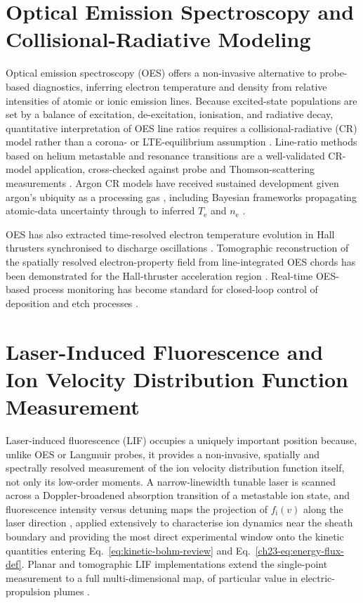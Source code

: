 \section{Optical Emission Spectroscopy and Collisional-Radiative Modeling}

Optical emission spectroscopy (OES) offers a non-invasive alternative to probe-based diagnostics, inferring electron temperature and density from relative intensities of atomic or ionic emission lines. Because excited-state populations are set by a balance of excitation, de-excitation, ionisation, and radiative decay, quantitative interpretation of OES line ratios requires a collisional-radiative (CR) model rather than a corona- or LTE-equilibrium assumption \cite{ref0260}. Line-ratio methods based on helium metastable and resonance transitions are a well-validated CR-model application, cross-checked against probe and Thomson-scattering measurements \cite{ref0266}. Argon CR models have received sustained development given argon's ubiquity as a processing gas \cite{ref0245}, including Bayesian frameworks propagating atomic-data uncertainty through to inferred $T_{\mathrm{e}}$ and $n_{\mathrm{e}}$ \cite{ref0275}.

OES has also extracted time-resolved electron temperature evolution in Hall thrusters synchronised to discharge oscillations \cite{ref0256}. Tomographic reconstruction of the spatially resolved electron-property field from line-integrated OES chords has been demonstrated for the Hall-thruster acceleration region \cite{ref0257}. Real-time OES-based process monitoring has become standard for closed-loop control of deposition and etch processes \cite{ref0553}.

\section{Laser-Induced Fluorescence and Ion Velocity Distribution Function Measurement}

Laser-induced fluorescence (LIF) occupies a uniquely important position because, unlike OES or Langmuir probes, it provides a non-invasive, spatially and spectrally resolved measurement of the ion velocity distribution function itself, not only its low-order moments. A narrow-linewidth tunable laser is scanned across a Doppler-broadened absorption transition of a metastable ion state, and fluorescence intensity versus detuning maps the projection of $f_{\mathrm{i}}(v)$ along the laser direction \cite{ref0292}, applied extensively to characterise ion dynamics near the sheath boundary \cite{ref0329} and providing the most direct experimental window onto the kinetic quantities entering Eq.~\eqref{eq:kinetic-bohm-review} and Eq.~\eqref{ch23-eq:energy-flux-def}. Planar and tomographic LIF implementations extend the single-point measurement to a full multi-dimensional map, of particular value in electric-propulsion plumes \cite{ref0328}.

